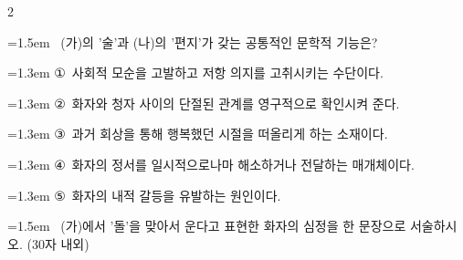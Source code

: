 \documentclass[10pt, a4paper]{article}
\begin{document}
\begin{multicols}{2}
\noindent\begin{minipage}{\columnwidth}
\vspace{2mm}
{\hangindent=1.5em  ~(가)의 '술'과 (나)의 '편지'가 갖는 공통적인 문학적 기능은?\par}

\vspace{0.5mm}
{\hangindent=1.3em  \noindent\hspace{0.3em}①~사회적 모순을 고발하고 저항 의지를 고취시키는 수단이다.\par}
{\hangindent=1.3em  \noindent\hspace{0.3em}②~화자와 청자 사이의 단절된 관계를 영구적으로 확인시켜 준다.\par}
{\hangindent=1.3em  \noindent\hspace{0.3em}③~과거 회상을 통해 행복했던 시절을 떠올리게 하는 소재이다.\par}
{\hangindent=1.3em  \noindent\hspace{0.3em}④~화자의 정서를 일시적으로나마 해소하거나 전달하는 매개체이다.\par}
{\hangindent=1.3em  \noindent\hspace{0.3em}⑤~화자의 내적 갈등을 유발하는 원인이다.\par}
\vspace{4mm}
\end{minipage}
\par

\noindent\begin{minipage}{\columnwidth}
\vspace{2mm}
{\hangindent=1.5em  ~(가)에서 '돌'을 맞아서 운다고 표현한 화자의 심정을 한 문장으로 서술하시오. (30자 내외)\par}

\vspace{3mm}
\noindent\hrulefill
\vspace{2.5mm}
\noindent\hrulefill
\vspace{2.5mm}
\noindent\hrulefill
\vspace{2.5mm}
\noindent\hrulefill
\vspace{2.5mm}
\noindent\hrulefill
\vspace{2.5mm}
\vspace{1mm}
\vspace{4mm}
\end{minipage}
\par


\end{multicols}
\end{document}
